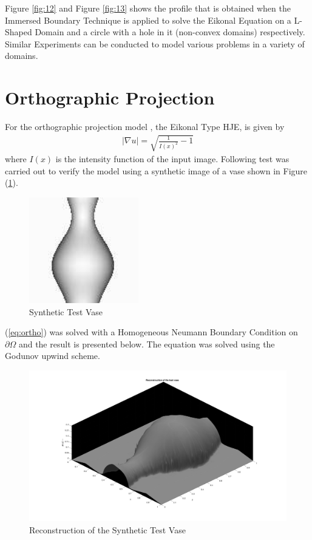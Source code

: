 									\noindent
									Figure \ref{fig:12} and Figure \ref{fig:13} shows the profile that is obtained when the Immersed Boundary Technique is applied to solve the Eikonal Equation on a L-Shaped Domain and a circle with a hole in it (non-convex domains) respectively. Similar Experiments can be conducted to model various problems in a variety of domains.

\section{Orthographic Projection}
For the orthographic projection model \cite{rouy}, the Eikonal Type HJE, is given by 
\begin{eqnarray}
	\lvert \nabla u \rvert = \sqrt{\frac{1}{I(x)^2} - 1}\label{eq:ortho}
\end{eqnarray}
where $I(x)$ is the intensity function of the input image. Following test was carried out to verify the model using a synthetic image of a vase shown in Figure (\ref{fig:14}). 
\begin{figure}[h!]
	\centering
	\includegraphics[scale = 1.5]{Images/vase.png}
	\caption{Synthetic Test Vase}
	\label{fig:14}
\end{figure}

\noindent
(\ref{eq:ortho}) was solved with a Homogeneous Neumann Boundary Condition on $\partial \Omega$ and the result is presented below. The equation was solved using the Godunov upwind scheme.
\begin{figure}[h!]
	\centering
	\includegraphics[scale = 0.15]{Images/vase.jpg}
	\caption{Reconstruction of the Synthetic Test Vase}
	\label{fig:15}
\end{figure}

